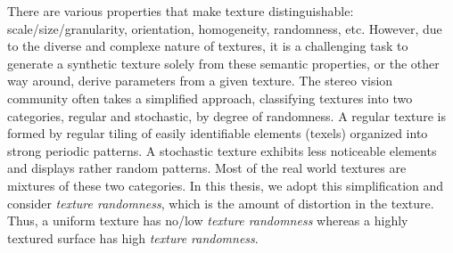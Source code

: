 There are various properties that make texture distinguishable: scale/size/granularity, orientation, homogeneity, randomness, etc. However, due to the diverse and complexe nature of textures, it is a challenging task to generate a synthetic texture solely from these semantic properties, or the other way around, derive parameters from a given texture. The stereo vision community often takes a simplified approach, classifying textures into two categories, regular and stochastic, by degree of randomness. A regular texture is formed by regular tiling of easily identifiable elements (texels) organized into strong periodic patterns. A stochastic texture exhibits less noticeable elements and displays rather random patterns. Most of the real world textures are mixtures of these two categories. In this thesis, we adopt this simplification and consider \textit{texture randomness}, which is the amount of distortion in the texture. Thus, a uniform texture has no/low \textit{texture randomness} whereas a highly textured surface has high \textit{texture randomness}.




